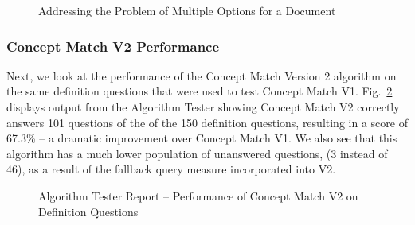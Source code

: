 \begin{figure}
\centering
\vspace{1.0in}
\caption{Addressing the Problem of Multiple Options for a Document}
\label{fig:concept_match_v2_multiple_concept_docs}
\end{figure}

\subsubsection{Concept Match V2 Performance}

Next, we look at the performance of the Concept Match Version 2 algorithm on the same definition questions that were used to test Concept Match V1.  Fig.~\ref{fig:concept_match_v2_training_set_results_def} displays output from the Algorithm Tester showing Concept Match V2 correctly answers 101 questions of the of the 150 definition questions, resulting in a score of 67.3\% -- a dramatic improvement over Concept Match V1.  We also see that this algorithm has a much lower population of unanswered questions, (3 instead of 46), as a result of the fallback query measure incorporated into V2.



\begin{figure}
\centering
\vspace{1.0in}
\caption{Algorithm Tester Report -- Performance of Concept Match V2 on Definition Questions}
\label{fig:concept_match_v2_training_set_results_def}
\end{figure}

